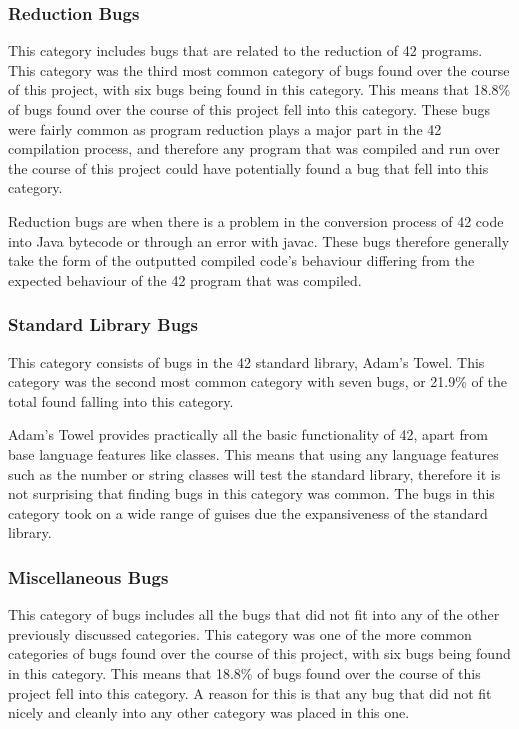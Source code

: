 \subsubsection{Reduction Bugs}

This category includes bugs that are related to the reduction of 42 programs. This category was the third most common category of bugs found over the course of this project, with six bugs being found in this category. This means that 18.8\% of bugs found over the course of this project fell into this category. These bugs were fairly common as program reduction plays a major part in the 42 compilation process, and therefore any program that was compiled and run over the course of this project could have potentially found a bug that fell into this category. 

Reduction bugs are when there is a problem in the conversion process of 42 code into Java bytecode or through an error with javac. These bugs therefore generally take the form of the outputted compiled code's behaviour differing from the expected behaviour of the 42 program that was compiled.

\subsubsection{Standard Library Bugs}

This category consists of bugs in the 42 standard library, Adam's Towel. This category was the second most common category with seven bugs, or 21.9\% of the total found falling into this category.

Adam's Towel provides practically all the basic functionality of 42, apart from base language features like classes. This means that using any language features such as the number or string classes will test the standard library, therefore it is not surprising that finding bugs in this category was common. The bugs in this category took on a wide range of guises due the expansiveness of the standard library.

\subsubsection{Miscellaneous Bugs}

This category of bugs includes all the bugs that did not fit into any of the other previously discussed categories. This category was one of the more common categories of bugs found over the course of this project, with six bugs being found in this category. This means that 18.8\% of bugs found over the course of this project fell into this category. A reason for this is that any bug that did not fit nicely and cleanly into any other category was placed in this one. 




